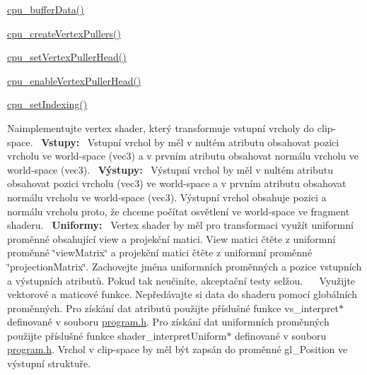 \begin{DoxyRefList}
\begin{DoxyItemize}
\item \hyperlink{buffer_8h_aad292278b58c11db74df3cb3e3a52f22}{cpu\+\_\+buffer\+Data()}
\item \hyperlink{vertexPuller_8h_a3b9678475f48f09c3ddbd4316fce3e08}{cpu\+\_\+create\+Vertex\+Pullers()}
\item \hyperlink{vertexPuller_8h_a07be46ae38b8ec80ec85581a33b02786}{cpu\+\_\+set\+Vertex\+Puller\+Head()}
\item \hyperlink{vertexPuller_8h_afc4c70416bc0e515e75ec90c8c8d1584}{cpu\+\_\+enable\+Vertex\+Puller\+Head()}
\item \hyperlink{vertexPuller_8h_aa312eaf555d453ead6a430f8f058c9a6}{cpu\+\_\+set\+Indexing()}  
\end{DoxyItemize}
\item[\label{todo__todo000008}%
\hypertarget{todo__todo000008}{}%
Global \hyperlink{group__shader__side_gabf238d989258c2c2e8e807e42e1c1404}{phong\+\_\+vertex\+Shader} (\hyperlink{structGPUVertexShaderOutput}{G\+P\+U\+Vertex\+Shader\+Output} $\ast$const output, \hyperlink{structGPUVertexShaderInput}{G\+P\+U\+Vertex\+Shader\+Input} const $\ast$const input, G\+PU const gpu)]Naimplementujte vertex shader, který transformuje vstupní vrcholy do clip-\/space.~\newline
 {\bfseries Vstupy\+:}~\newline
 Vstupní vrchol by měl v nultém atributu obsahovat pozici vrcholu ve world-\/space (vec3) a v prvním atributu obsahovat normálu vrcholu ve world-\/space (vec3).~\newline
 {\bfseries Výstupy\+:}~\newline
 Výstupní vrchol by měl v nultém atributu obsahovat pozici vrcholu (vec3) ve world-\/space a v prvním atributu obsahovat normálu vrcholu ve world-\/space (vec3). Výstupní vrchol obsahuje pozici a normálu vrcholu proto, že chceme počítat osvětlení ve world-\/space ve fragment shaderu.~\newline
 {\bfseries Uniformy\+:}~\newline
 Vertex shader by měl pro transformaci využít uniformní proměnné obsahující view a projekční matici. View matici čtěte z uniformní proměnné \char`\"{}view\+Matrix\char`\"{} a projekční matici čtěte z uniformní proměnné \char`\"{}projection\+Matrix\char`\"{}. Zachovejte jména uniformních proměnných a pozice vstupních a výstupních atributů. Pokud tak neučiníte, akceptační testy selžou.~\newline
 ~\newline
 Využijte vektorové a maticové funkce. Nepředávajte si data do shaderu pomocí globálních proměnných. Pro získání dat atributů použijte příslušné funkce vs\+\_\+interpret$\ast$ definované v souboru \hyperlink{program_8h}{program.\+h}. Pro získání dat uniformních proměnných použijte příslušné funkce shader\+\_\+interpret\+Uniform$\ast$ definované v souboru \hyperlink{program_8h}{program.\+h}. Vrchol v clip-\/space by měl být zapsán do proměnné gl\+\_\+\+Position ve výstupní struktuře.~\newline

\end{DoxyRefList}
